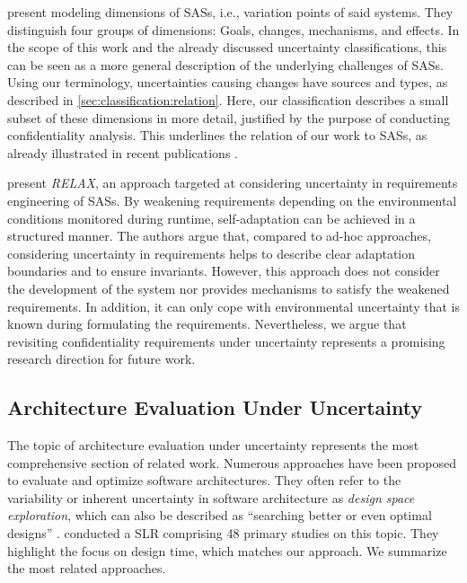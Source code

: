 \textcite{andersson_modeling_2009} present modeling dimensions of \acp{SAS}, i.e., variation points of said systems.
They distinguish four groups of dimensions: Goals, changes, mechanisms, and effects.
In the scope of this work and the already discussed uncertainty classifications, this can be seen as a more general description of the underlying challenges of \acp{SAS}.
Using our terminology, uncertainties causing changes have sources and types, as described in \autoref{sec:classification:relation}.
Here, our classification describes a small subset of these dimensions in more detail, justified by the purpose of conducting confidentiality analysis.
This underlines the relation of our work to \acp{SAS}, as already illustrated in recent publications \cite{weyns_towards_2023,camara_uncertainty_2024}.

\textcite{whittle_relax_2009} present \emph{RELAX}, an approach targeted at considering uncertainty in requirements engineering of \acp{SAS}.
By weakening requirements depending on the environmental conditions monitored during runtime, self-adaptation can be achieved in a structured manner.
The authors argue that, compared to ad-hoc approaches, considering uncertainty in requirements helps to describe clear adaptation boundaries and to ensure invariants.
However, this approach does not consider the development of the system nor provides mechanisms to satisfy the weakened requirements. 
In addition, it can only cope with environmental uncertainty that is known during formulating the requirements.
Nevertheless, we argue that revisiting confidentiality requirements under uncertainty represents a promising research direction for future work.


\subsection{Architecture Evaluation Under Uncertainty}

The topic of architecture evaluation under uncertainty represents the most comprehensive section of related work.
Numerous approaches \cite{esfahani_dealing_2012,koziolek_peropteryx_2011,aleti_archeopterix_2009,lytra_supporting_2013,vanherpen_design-space_2014,esfahani_guidearch_2013} have been proposed to evaluate and optimize software architectures.
They often refer to the variability or inherent uncertainty in software architecture as \emph{design space exploration}, which can also be described as \enquote{searching better or even optimal designs} \cite{koziolek_automated_2011}.
\textcite{sobhy_evaluation_2021} conducted a \ac{SLR} comprising 48 primary studies on this topic.
They highlight the focus on design time, which matches our approach.
We summarize the most related approaches.

